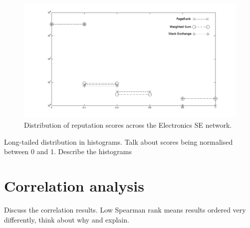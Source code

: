 \documentclass[]{final_report}
\begin{document}
\begin{figure}[ht!]
\centering
\includegraphics[width=120mm]{chap3/electronics_hist.png}
\caption{Distribution of reputation scores across the Electronics SE network.}
\end{figure}\label{gra:electronicshist}

Long-tailed distribution in histograms. Talk about scores being normalised between 0 and 1. Describe the histograms

\section{Correlation analysis}

Discuss the correlation results. Low Spearman rank means results ordered very differently, think about why and explain.
\end{document}
